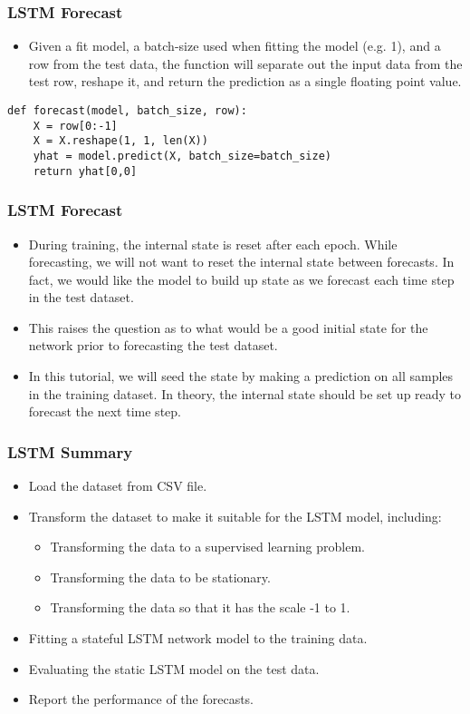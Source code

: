 \begin{frame}[fragile] \frametitle{LSTM Forecast}
\begin{itemize}
\item Given a fit model, a batch-size used when fitting the model (e.g. 1), and a row from the test data, the function will separate out the input data from the test row, reshape it, and return the prediction as a single floating point value.
\end{itemize}
\begin{lstlisting}
def forecast(model, batch_size, row):
	X = row[0:-1]
	X = X.reshape(1, 1, len(X))
	yhat = model.predict(X, batch_size=batch_size)
	return yhat[0,0]
\end{lstlisting} 
\end{frame}

\begin{frame}[fragile] \frametitle{LSTM Forecast}
\begin{itemize}
\item During training, the internal state is reset after each epoch. While forecasting, we will not want to reset the internal state between forecasts. In fact, we would like the model to build up state as we forecast each time step in the test dataset.
\item 
This raises the question as to what would be a good initial state for the network prior to forecasting the test dataset.
\item 
In this tutorial, we will seed the state by making a prediction on all samples in the training dataset. In theory, the internal state should be set up ready to forecast the next time step.
\end{itemize}
\end{frame}


\begin{frame}[fragile] \frametitle{LSTM Summary}
\begin{itemize}
\item Load the dataset from CSV file.
\item     Transform the dataset to make it suitable for the LSTM model, including:
\begin{itemize}
\item         Transforming the data to a supervised learning problem.
\item         Transforming the data to be stationary.
\item         Transforming the data so that it has the scale -1 to 1.
\end{itemize}
\item     Fitting a stateful LSTM network model to the training data.
\item     Evaluating the static LSTM model on the test data.
\item     Report the performance of the forecasts.

\end{itemize}
\end{frame}


